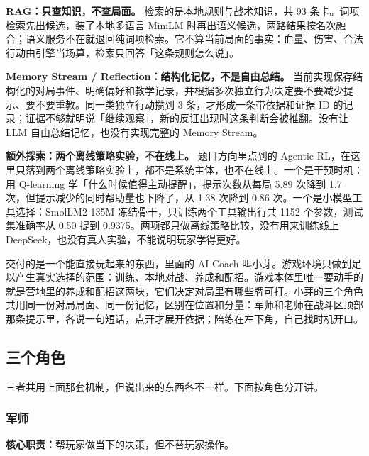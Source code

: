 \textbf{RAG：只查知识，不查局面。} 检索的是本地规则与战术知识，共 93 条卡。词项检索先出候选，装了本地多语言 MiniLM 时再出语义候选，两路结果按名次融合；语义服务不在就退回纯词项检索。它不算当前局面的事实：血量、伤害、合法行动由引擎当场算，检索只回答「这条规则怎么说」。

\textbf{Memory Stream / Reflection：结构化记忆，不是自由总结。} 当前实现保存结构化的对局事件、明确偏好和教学记录，并根据多次独立行为决定要不要减少提示、要不要重教。同一类独立行动攒到 3 条，才形成一条带依据和证据 ID 的记录；证据不够就明说「继续观察」，新的反证出现时这条判断会被推翻。没有让 LLM 自由总结记忆，也没有实现完整的 Memory Stream。

\textbf{额外探索：两个离线策略实验，不在线上。} 题目方向里点到的 Agentic RL，在这里只落到两个离线策略实验上，都不是系统主体，也不在线上。一个是干预时机：用 Q-learning 学「什么时候值得主动提醒」，提示次数从每局 5.89 次降到 1.7 次，但提示减少的同时帮助量也下降了，从 1.38 次降到 0.86 次。一个是小模型工具选择：SmolLM2-135M 冻结骨干，只训练两个工具输出行共 1152 个参数，测试集准确率从 0.50 提到 0.9375。两项都只做离线策略比较，没有用来训练线上 DeepSeek，也没有真人实验，不能说明玩家学得更好。



交付的是一个能直接玩起来的东西，里面的 AI Coach 叫小芽。游戏环境只做到足以产生真实选择的范围：训练、本地对战、养成和配招。游戏本体里唯一要动手的就是营地里的养成和配招这两块，它们决定对局里有哪些牌可打。小芽的三个角色共用同一份对局局面、同一份记忆，区别在位置和分量：军师和老师在战斗区顶部那条提示里，各说一句短话，点开才展开依据；陪练在左下角，自己找时机开口。

\subsection{三个角色}

三者共用上面那套机制，但说出来的东西各不一样。下面按角色分开讲。

\subsubsection{军师}

\noindent\textbf{核心职责：}帮玩家做当下的决策，但不替玩家操作。\par\vspace{0.15em}





